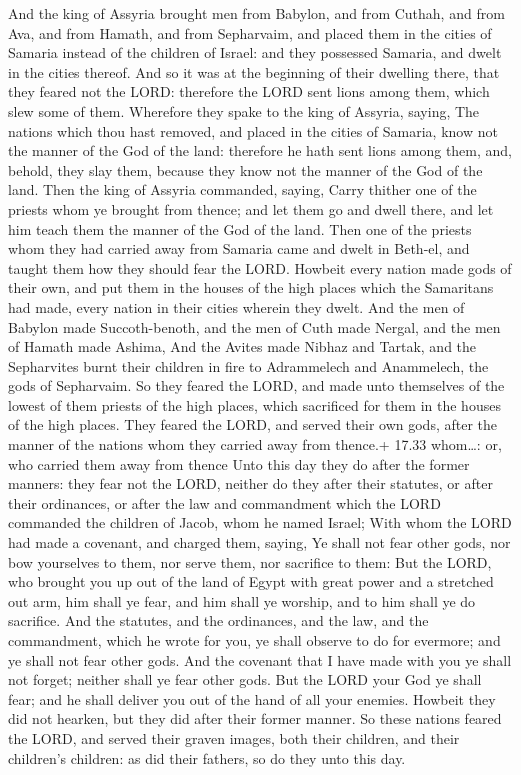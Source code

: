  And the king of Assyria brought men from Babylon, and
from Cuthah, and from Ava, and from Hamath, and from Sepharvaim, and
placed them in the cities of Samaria instead of the children of Israel:
and they possessed Samaria, and dwelt in the cities thereof.
 And so it was at the beginning of their dwelling there,
that they feared not the LORD: therefore the LORD sent lions among them,
which slew some of them.  Wherefore they spake to the king
of Assyria, saying, The nations which thou hast removed, and placed in
the cities of Samaria, know not the manner of the God of the land:
therefore he hath sent lions among them, and, behold, they slay them,
because they know not the manner of the God of the land. 
Then the king of Assyria commanded, saying, Carry thither one of the
priests whom ye brought from thence; and let them go and dwell there,
and let him teach them the manner of the God of the land. 
Then one of the priests whom they had carried away from Samaria came and
dwelt in Beth-el, and taught them how they should fear the LORD.
 Howbeit every nation made gods of their own, and put them
in the houses of the high places which the Samaritans had made, every
nation in their cities wherein they dwelt.  And the men of
Babylon made Succoth-benoth, and the men of Cuth made Nergal, and the
men of Hamath made Ashima,  And the Avites made Nibhaz and
Tartak, and the Sepharvites burnt their children in fire to Adrammelech
and Anammelech, the gods of Sepharvaim.  So they feared the
LORD, and made unto themselves of the lowest of them priests of the high
places, which sacrificed for them in the houses of the high places.
 They feared the LORD, and served their own gods, after the
manner of the nations whom they carried away from thence.+ 17.33
whom\ldots: or, who carried them away from thence  Unto
this day they do after the former manners: they fear not the LORD,
neither do they after their statutes, or after their ordinances, or
after the law and commandment which the LORD commanded the children of
Jacob, whom he named Israel;  With whom the LORD had made a
covenant, and charged them, saying, Ye shall not fear other gods, nor
bow yourselves to them, nor serve them, nor sacrifice to them:
 But the LORD, who brought you up out of the land of Egypt
with great power and a stretched out arm, him shall ye fear, and him
shall ye worship, and to him shall ye do sacrifice.  And
the statutes, and the ordinances, and the law, and the commandment,
which he wrote for you, ye shall observe to do for evermore; and ye
shall not fear other gods.  And the covenant that I have
made with you ye shall not forget; neither shall ye fear other gods.
 But the LORD your God ye shall fear; and he shall deliver
you out of the hand of all your enemies.  Howbeit they did
not hearken, but they did after their former manner.  So
these nations feared the LORD, and served their graven images, both
their children, and their children's children: as did their fathers, so
do they unto this day.


